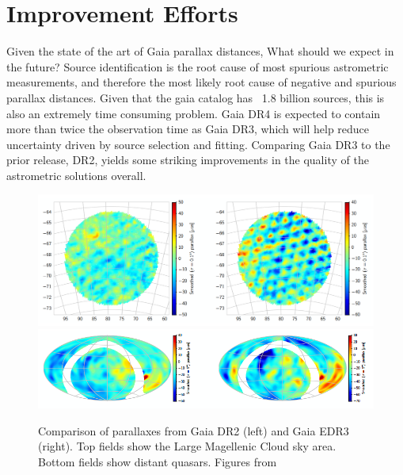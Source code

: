 \documentclass[twocolumn]{aastex631}
\begin{document}
\section{Improvement Efforts} \label{sec:improvement}

Given the state of the art of Gaia parallax distances, What should we expect in the future? Source identification is the root cause of most spurious astrometric measurements, and therefore the most likely root cause of negative and spurious parallax distances. Given that the gaia catalog has ~1.8 billion sources, this is also an extremely time consuming problem. Gaia DR4 is expected to contain more than twice the observation time as Gaia DR3, which will help reduce uncertainty driven by source selection and fitting\citep{lindegrenGaia2021a}. Comparing Gaia DR3 to the prior release, DR2, yields some striking improvements in the quality of the astrometric solutions overall.
\begin{figure}
	\includegraphics[width=\columnwidth]{lmcDR2vsDR3crop.png}
	\includegraphics[width=\columnwidth]{quasarcrop.png}
	\caption{Comparison of parallaxes from Gaia DR2 (left) and Gaia EDR3 (right). Top fields show the Large Magellenic Cloud sky area. Bottom fields show distant quasars. Figures from \cite{lindegrenGaia2021a}}
	\label{fig:compare}
\end{figure}
\end{document}
